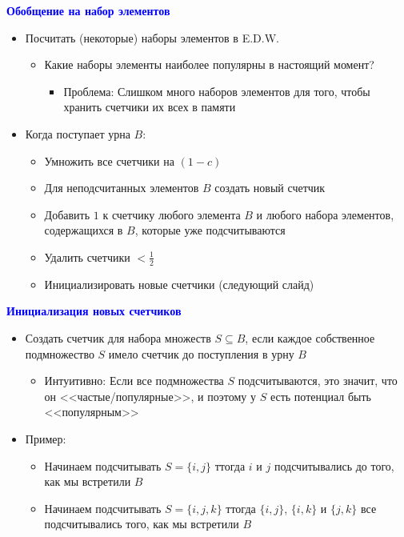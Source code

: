 \documentclass[landscape]{slides}
\begin{document}
\begin{normalsize}
\begin{slide}
\textbf{\textcolor{blue}{Обобщение на набор элементов}}

\begin{itemize}
\item Посчитать (некоторые) наборы элементов в E.D.W.
  \begin{itemize}
  \item Какие наборы элементы наиболее популярны в настоящий момент?
    \begin{itemize}
    \item Проблема: Слишком много наборов элементов для того, чтобы хранить счетчики их всех в памяти
    \end{itemize}
  \end{itemize}
\item Когда поступает урна $B$:
  \begin{itemize}
  \item Умножить все счетчики на $(1-c)$
  \item Для неподсчитанных элементов $B$ создать новый счетчик
  \item Добавить $1$ к счетчику любого элемента $B$ и любого набора элементов, содержащихся в $B$, которые уже подсчитываются
  \item Удалить счетчики $<\frac 12$
  \item Инициализировать новые счетчики (следующий слайд)
  \end{itemize}
\end{itemize}
\end{slide}


\begin{slide}
\textbf{\textcolor{blue}{Инициализация новых счетчиков}}

\begin{itemize}
\item Создать счетчик для набора множеств $S\subseteq B$, если каждое собственное подмножество $S$ имело счетчик до поступления в урну $B$
  \begin{itemize}
  \item Интуитивно: Если все подмножества $S$ подсчитываются, это значит, что он <<частые/популярные>>, и поэтому у $S$ есть потенциал быть <<популярным>>
  \end{itemize}
\item Пример:
  \begin{itemize}
  \item Начинаем подсчитывать $S=\{i,j\}$ ттогда $i$ и $j$ подсчитывались до того, как мы встретили $B$
  \item Начинаем подсчитывать $S=\{i,j,k\}$ ттогда $\{i,j\}$, $\{i,k\}$ и $\{j,k\}$ все подсчитывались того, как мы встретили $B$
  \end{itemize}
\end{itemize}
\end{slide}



\end{normalsize}
\end{document}
